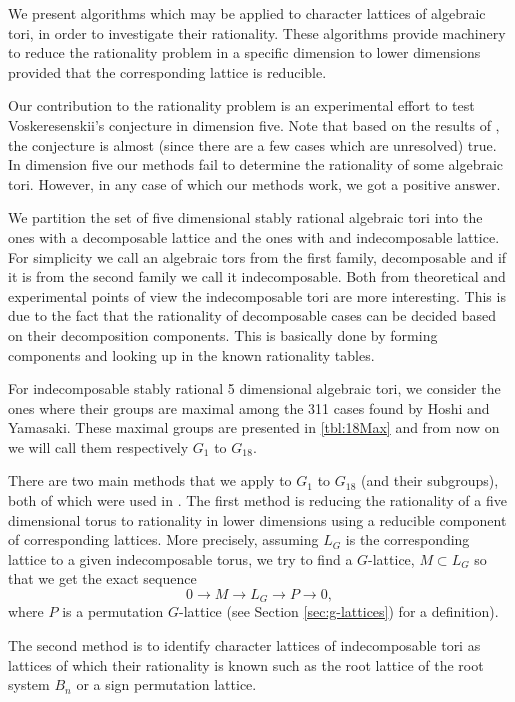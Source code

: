 \documentclass[12pt]{article}
\theoremstyle{plain}
\theoremstyle{definition}
\begin{document}
We present algorithms which may be applied to character lattices of algebraic 
tori, in order to investigate their rationality. These algorithms provide 
machinery to reduce the rationality problem in a specific dimension to lower dimensions
provided that the corresponding lattice is reducible.

Our contribution to the rationality problem is an experimental effort to 
test Voskeresenskii's conjecture in dimension five. Note that based on the results of 
\cite{Nicole1}, the conjecture is almost (since there are a few cases which are unresolved) 
true. In dimension five our methods fail to determine the rationality of some algebraic tori.
However, in any case of which our methods work, we got a positive answer.

We partition the set of five dimensional stably rational algebraic tori into the ones with a 
decomposable lattice and the ones with and indecomposable lattice. For simplicity we call an algebraic tors from the first family, decomposable and if it is from the second family we call it indecomposable. Both from theoretical and 
experimental points of view the indecomposable tori are more interesting. This is due to the
fact that the rationality of decomposable cases can be decided based on their decomposition
 components. This is basically done by forming components and looking up in the 
 known rationality tables. 

For indecomposable stably rational 5 dimensional algebraic tori,
we consider the ones where their groups are maximal among the 311 cases found by Hoshi and 
Yamasaki. These maximal groups are presented in \ref{tbl:18Max} and from now on we will call them
respectively $G_1$ to $G_{18}$. 

There are two 
main methods that we apply to $G_1$ to $G_{18}$ (and their subgroups), both of which were used in \cite{Nicole1}. The 
first method is reducing the rationality of a five dimensional torus to rationality 
in lower dimensions using a reducible component of corresponding lattices. More precisely, assuming $L_G$ is the corresponding lattice to a given indecomposable torus, we try to find a $G$-lattice, $M\subset
L_G$ so that we get the exact sequence 
$$0 \longrightarrow M \longrightarrow L_G \longrightarrow P \longrightarrow 0, $$
where $P$ is a permutation $G$-lattice (see Section \ref{sec:g-lattices}) for a definition).

The second method is to identify character lattices of indecomposable tori as lattices of which their rationality is known such as the root lattice of the root system $B_n$ or a sign permutation lattice.
\end{document}
